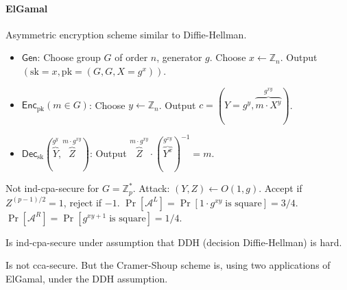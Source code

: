 \documentclass[11pt]{article}
\newcommand{\Gen}{\ensuremath{\mathsf{Gen}}}
\newcommand{\Enc}{\ensuremath{\mathsf{Enc}}}
\newcommand{\Dec}{\ensuremath{\mathsf{Dec}}}
\newcommand{\ZZ}{\ensuremath{\mathds{Z}}}
\newcommand{\pk}{\text{pk}}
\newcommand{\sk}{\text{sk}}
\theoremstyle{remark}
\begin{document}
\paragraph{ElGamal}
Asymmetric encryption scheme similar to Diffie-Hellman.
\begin{itemize}
\item $\Gen$: Choose group $G$ of order $n$, generator $g$.
      Choose $x\gets\ZZ_n$. Output $(\sk=x,\pk=(G,G,X=g^x))$.
\item $\Enc_\pk(m\in G)$: Choose $y\gets\ZZ_n$.
      Output $c=(Y=g^y, \overbrace{m\cdot X^y}^{g^{xy}})$.
\item $\Dec_\sk(\overbrace{Y}^{g^y},\overbrace{Z}^{m\cdot g^{xy}})$:
      Output $\overbrace{Z}^{m\cdot g^{xy}}\cdot({\overbrace{Y^x}^{g^{xy}}})^{-1} = m$.
\end{itemize}

Not ind-cpa-secure for $G=\ZZ_p^*$.
Attack: $(Y,Z)\gets O(1,g)$.
Accept if $Z^{(p-1)/2}=1$, reject if $-1$.
$\Pr[\mathcal{A}^L]=\Pr[1\cdot g^{xy}\;\text{is square}]=3/4$.
$\Pr[\mathcal{A}^R]=\Pr[g^{xy+1}\;\text{is square}]=1/4$.

Is ind-cpa-secure under assumption that DDH (decision Diffie-Hellman) is hard.

Is not cca-secure.
But the Cramer-Shoup scheme is,
using two applications of ElGamal,
under the DDH assumption.
\end{document}
